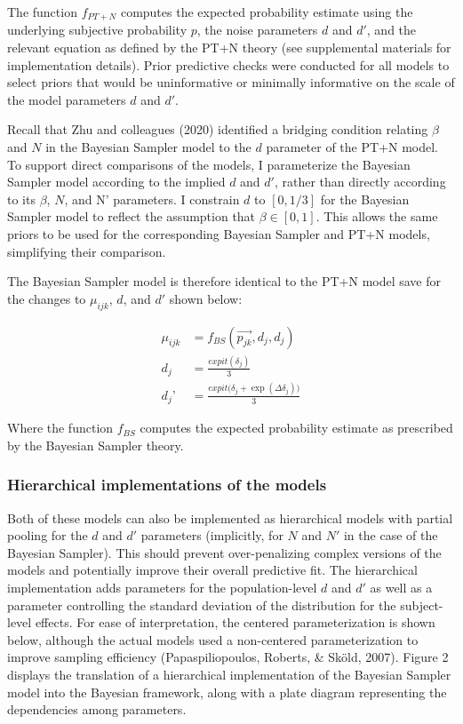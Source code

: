 \documentclass[
  english,
  man,floatsintext]{apa6}
\begin{document}
The function \(f_{PT+N}\) computes the expected probability estimate using the underlying subjective probability \(p\), the noise parameters \(d\) and \(d'\), and the relevant equation as defined by the PT+N theory (see supplemental materials for implementation details). Prior predictive checks were conducted for all models to select priors that would be uninformative or minimally informative on the scale of the model parameters \(d\) and \(d'\).

Recall that Zhu and colleagues (2020) identified a bridging condition relating \(\beta\) and \(N\) in the Bayesian Sampler model to the \(d\) parameter of the PT+N model. To support direct comparisons of the models, I parameterize the Bayesian Sampler model according to the implied \(d\) and \(d'\), rather than directly according to its \(\beta\), \(N\), and N' parameters. I constrain \(d\) to \([0, 1/3]\) for the Bayesian Sampler model to reflect the assumption that \(\beta \in [0, 1]\). This allows the same priors to be used for the corresponding Bayesian Sampler and PT+N models, simplifying their comparison.

The Bayesian Sampler model is therefore identical to the PT+N model save for the changes to \(\mu_{ijk}\), \(d\), and \(d'\) shown below:

\begin{align*}
  \mu_{ijk} &= f_{BS}(\overrightarrow{p_{jk}}, d_j, d_j)  \\
  d_j &= \frac{expit(\delta_j)}{3} \\
  d_j’ &= \frac{expit\big(\delta_j + \exp(\Delta\delta_j)\big)}{3}
\end{align*}

Where the function \(f_{BS}\) computes the expected probability estimate as prescribed by the Bayesian Sampler theory.

\hypertarget{hierarchical-implementations-of-the-models}{%
\subsubsection{Hierarchical implementations of the models}\label{hierarchical-implementations-of-the-models}}

Both of these models can also be implemented as hierarchical models with partial pooling for the \(d\) and \(d'\) parameters (implicitly, for \(N\) and \(N'\) in the case of the Bayesian Sampler). This should prevent over-penalizing complex versions of the models and potentially improve their overall predictive fit. The hierarchical implementation adds parameters for the population-level \(d\) and \(d'\) as well as a parameter controlling the standard deviation of the distribution for the subject-level effects. For ease of interpretation, the centered parameterization is shown below, although the actual models used a non-centered parameterization to improve sampling efficiency (Papaspiliopoulos, Roberts, \& Sköld, 2007). Figure 2 displays the translation of a hierarchical implementation of the Bayesian Sampler model into the Bayesian framework, along with a plate diagram representing the dependencies among parameters.
\end{document}
